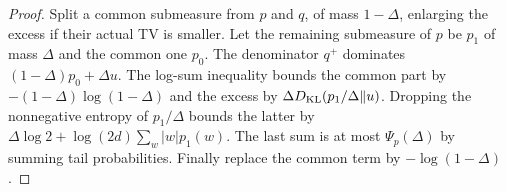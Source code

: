 \begin{proof}
Split a common submeasure from $p$ and $q$, of mass $1-\Delta$,
enlarging the excess if their actual TV is smaller. Let the remaining
submeasure of $p$ be $p_1$ of mass $\Delta$ and the common one $p_0$.
The denominator $q^+$ dominates $(1-\Delta)p_0+\Delta u$.
The log-sum inequality bounds the common part by
$-(1-\Delta)\log(1-\Delta)$ and the excess by
$\Delta D_{\rm KL}(p_1/\Delta\|u)$.
Dropping the nonnegative entropy of $p_1/\Delta$ bounds the latter by
$\Delta\log2+\log(2d)\sum_w|w|p_1(w)$.
The last sum is at most $\Psi_p(\Delta)$ by summing tail probabilities.
Finally replace the common term by $-\log(1-\Delta)$.
\end{proof}
